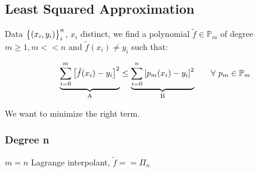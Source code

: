\subsection{Least Squared Approximation}
    Data $\Brackets{(x_i,y_i)}^n_{i}$, $x_i$ distinct, we find a polynomial $\tilde{f}\in\mathbb{P}_m$ of degree $m\geq 1,m<<n$ and $\tilde{f}(x_i)\neq y_i$ such that:
    \begin{LARGE}
        $$
        \underlabel{
            \sum_{i=0}^m\left[\tilde{f}(x_i)-y_i\right]^2
        }{A}
        \leq
        \underlabel{
            \sum_{i=0}^n\left[p_m(x_i)-y_i\right]^2
        }{B}
        \qquad\forall\,\,p_m\in\mathbb{P}_m
        $$
    \end{LARGE}
    We want to minimize the right term.
    \subsubsection{Degree n}
    $m=n$ Lagrange interpolant, $\tilde{f}==\Pi_n$

